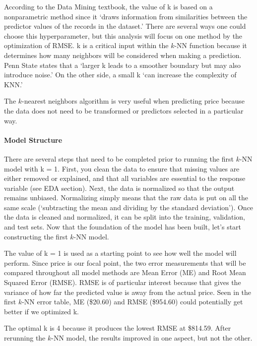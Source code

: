 \documentclass[
  paper=a4,
  ,captions=tableheading
]{scrartcl}
\begin{document}
According to the Data Mining textbook, the value of k is based on a
nonparametric method since it `draws information from similarities
between the predictor values of the records in the dataset.' There are
several ways one could choose this hyperparameter, but this analysis
will focus on one method by the optimization of RMSE. k is a critical
input within the \(k\)-NN function because it determines how many
neighbors will be considered when making a prediction. Penn State states
that a `larger k leads to a smoother boundary but may also introduce
noise.' On the other side, a small k `can increase the complexity of
KNN.'

The \(k\)-nearest neighbors algorithm is very useful when predicting
price because the data does not need to be transformed or predictors
selected in a particular way.

\hypertarget{model-structure}{%
\paragraph{Model Structure}\label{model-structure}}

There are several steps that need to be completed prior to running the
first \(k\)-NN model with k = 1. First, you clean the data to ensure
that missing values are either removed or explained, and that all
variables are essential to the response variable (see EDA section).
Next, the data is normalized so that the output remains unbiased.
Normalizing simply means that the raw data is put on all the same scale
(`subtracting the mean and dividing by the standard deviation'). Once
the data is cleaned and normalized, it can be split into the training,
validation, and test sets. Now that the foundation of the model has been
built, let's start constructing the first \(k\)-NN model.

The value of k = 1 is used as a starting point to see how well the model
will perform. Since price is our focal point, the two error measurements
that will be compared throughout all model methods are Mean Error (ME)
and Root Mean Squared Error (RMSE). RMSE is of particular interest
because that gives the variance of how far the predicted value is away
from the actual price. Seen in the first \(k\)-NN error table, ME
(\$20.60) and RMSE (\$954.60) could potentially get better if we
optimized k.

The optimal k is 4 because it produces the lowest RMSE at \$814.59.
After rerunning the \(k\)-NN model, the results improved in one aspect,
but not the other.
\end{document}
